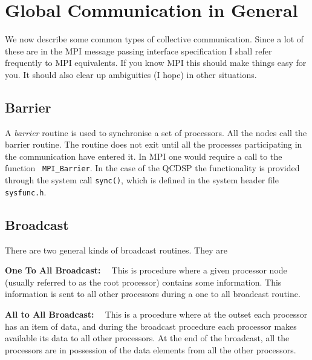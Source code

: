 \section{Global Communication in General}
We now describe some common types of collective communication.
Since a lot of these are in the MPI message passing interface
specification I shall refer frequently to MPI equivalents. If
you know MPI this should make things easy for you. It should
also clear up ambiguities (I hope) in other situations.

\subsection{Barrier} 
A {\em barrier} routine is used to synchronise a set of processors.
All the nodes call the barrier routine. The routine does not exit
until all the processes participating in the communication have
entered it. In MPI one would require a call to the function {\tt
MPI\_Barrier}. In the case of the QCDSP the functionality is provided
through the system call {\tt sync()}, which is defined in the system
header file {\tt sysfunc.h}.

\subsection{Broadcast}
There are two general kinds of broadcast routines. They are 
\begin{description}
\item{\bf One To All Broadcast: \ }
This is procedure where a given processor node (usually referred to as
the root processor) contains some information. This information 
is sent to all other processors during a one to all broadcast routine.
\item{\bf All to All Broadcast: \ }
This is a procedure where at the outset each processor has an item
of data, and during the broadcast procedure each processor makes available
its data to all other processors. At the end of the broadcast, all
the processors are in possession of the data elements from all the other
processors.
\end{description}

